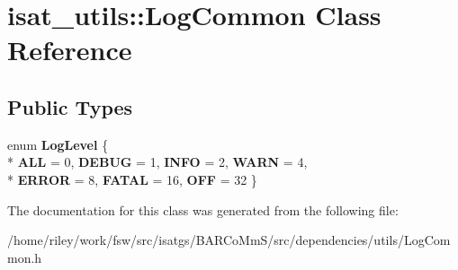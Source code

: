 \hypertarget{classisat__utils_1_1_log_common}{}\section{isat\+\_\+utils\+:\+:Log\+Common Class Reference}
\label{classisat__utils_1_1_log_common}
\subsection*{Public Types}
\begin{DoxyCompactItemize}
\item 
enum {\bfseries Log\+Level} \{ \\*
{\bfseries A\+LL} = 0, 
{\bfseries D\+E\+B\+UG} = 1, 
{\bfseries I\+N\+FO} = 2, 
{\bfseries W\+A\+RN} = 4, 
\\*
{\bfseries E\+R\+R\+OR} = 8, 
{\bfseries F\+A\+T\+AL} = 16, 
{\bfseries O\+FF} = 32
 \}\hypertarget{classisat__utils_1_1_log_common_a9fcc60e3eb21a64ea36a42a3084bb280}{}\label{classisat__utils_1_1_log_common_a9fcc60e3eb21a64ea36a42a3084bb280}

\end{DoxyCompactItemize}


The documentation for this class was generated from the following file\+:\begin{DoxyCompactItemize}
\item 
/home/riley/work/fsw/src/isatgs/\+B\+A\+R\+Co\+Mm\+S/src/dependencies/utils/Log\+Common.\+h\end{DoxyCompactItemize}
